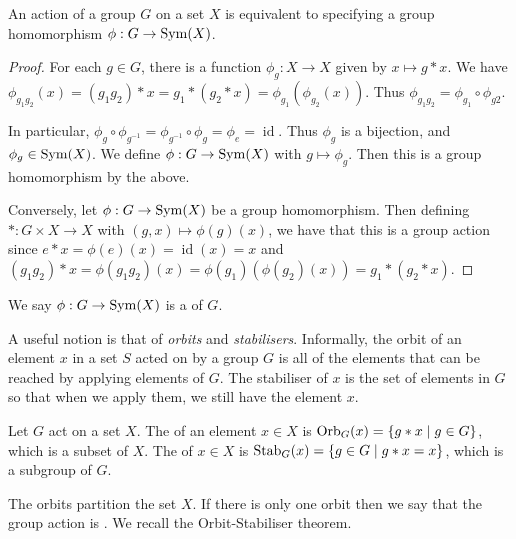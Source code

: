 \documentclass[a4paper]{scrartcl}
\begin{document}
\begin{proposition}
	An action of a group $G$ on a set $X$ is equivalent to specifying a group homomorphism $\phi: G \rightarrow \operatorname{Sym}(X)$.
\end{proposition}
\begin{proof}
	For each $g \in G$, there is a function $\phi_g : X \rightarrow X$ given by $x \mapsto g * x$. We have $\phi_{g_1 g_2}(x) = (g_1 g_2) * x = g_1 * (g_2 * x) = \phi_{g_1} (\phi_{g_2}(x))$. Thus $\phi_{g_1 g_2} = \phi_{g_1} \circ \phi_{g2}$.
	
	In particular, $\phi_g \circ \phi_{g^{-1}} = \phi_{g^{-1}} \circ \phi_g = \phi_e = \operatorname{id}$. Thus $\phi_g$ is a bijection, and $\phi_g \in \operatorname{Sym}(X)$. We define $\phi : G \rightarrow \operatorname{Sym}(X)$ with $g \mapsto \phi_g$. Then this is a group homomorphism by the above.
	
	Conversely, let $\phi : G \rightarrow \operatorname{Sym}(X)$ be a group homomorphism. Then defining $*: G \times X \rightarrow X$ with $(g, x) \mapsto \phi(g)(x)$, we have that this is a group action since $e * x = \phi(e)(x) = \operatorname{id}(x) = x$ and $(g_1 g_2) * x = \phi(g_1 g_2)(x) = \phi(g_1)(\phi(g_2)(x)) = g_1 * (g_2 * x)$.
\end{proof}

\begin{definition}
	We say $\phi: G \rightarrow \operatorname{Sym}(X)$ is a  of $G$.
\end{definition}


A useful notion is that of \emph{orbits} and \emph{stabilisers}. Informally, the orbit of an element $x$ in a set $S$ acted on by a group $G$ is all of the elements that can be reached by applying elements of $G$. The stabiliser of $x$ is the set of elements in $G$ so that when we apply them, we still have the element $x$.

\begin{definition}
	Let $G$ act on a set $X$. The  of an element $x \in X$ is $\operatorname{Orb}_G(x) = \{ g * x \mid g \in G \}$, which is a subset of $X$. The  of $x \in X$ is $\operatorname{Stab}_G(x) = \{ g \in G \mid g * x = x \}$, which is a subgroup of $G$.
\end{definition}

The orbits partition the set $X$. If there is only one orbit then we say that the group action is .
We recall the Orbit-Stabiliser theorem.
\end{document}
